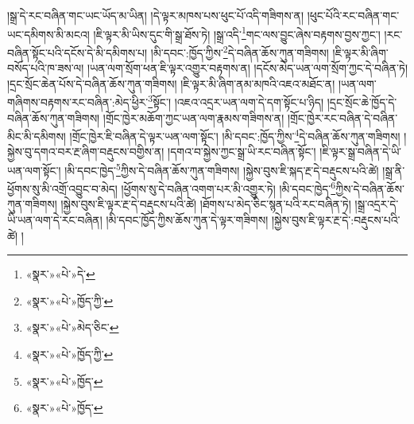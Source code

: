 །སྒྲ་དེ་རང་བཞིན་གང་ཡང་ཡོད་མ་ཡིན། །དེ་ལྟར་མཁས་པས་ཕུང་པོ་འདི་གཟིགས་ན། །ཕུང་པོའི་རང་བཞིན་གང་ཡང་དམིགས་མི་མངའ། །ཇི་ལྟར་མི་ཡིས་དུང་གི་སྒྲ་ཐོས་ཏེ། །སྒྲ་འདི་\footnote{«སྣར་»«པེ་»དེ་}གང་ལས་བྱུང་ཞེས་བརྟགས་བྱས་ཀྱང་། །རང་བཞིན་སྟོང་པའི་དངོས་དེ་མི་དམིགས་པ། །མི་དབང་:ཁྱོད་ཀྱིས་\footnote{«སྣར་»«པེ་»ཁྱོད་ཀྱི་}དེ་བཞིན་ཆོས་ཀུན་གཟིགས། །ཇི་ལྟར་མི་ཞིག་བསོད་པའི་ཁ་ཟས་ལ། །ཡན་ལག་སྲོག་ཕན་ཇི་ལྟར་འགྱུར་བརྟགས་ན། །དངོས་མེད་ཡན་ལག་སྲོག་ཀྱང་དེ་བཞིན་ཏེ། །དྲང་སྲོང་ཆེན་པོས་དེ་བཞིན་ཆོས་ཀུན་གཟིགས། །ཇི་ལྟར་མི་ཞིག་ནམ་མཁའི་འཇའ་མཐོང་ན། །ཡན་ལག་གཞིགས་བརྟགས་རང་བཞིན་:མེད་ཕྱིར་\footnote{«སྣར་»«པེ་»མེད་ཅིང་}སྟོང་། །འཇའ་འདྲར་ཡན་ལག་དེ་དག་སྟོང་པ་ཉིད། །དྲང་སྲོང་ཆེ་ཁྱོད་དེ་བཞིན་ཆོས་ཀུན་གཟིགས། །གྲོང་ཁྱེར་མཆོག་ཀྱང་ཡན་ལག་རྣམས་གཟིགས་ན། །གྲོང་ཁྱེར་རང་བཞིན་དེ་བཞིན་མིང་མི་དམིགས། །གྲོང་ཁྱེར་ཇི་བཞིན་དེ་ལྟར་ཡན་ལག་སྟོང་། །མི་དབང་:ཁྱོད་ཀྱིས་\footnote{«སྣར་»«པེ་»ཁྱོད་ཀྱི་}དེ་བཞིན་ཆོས་ཀུན་གཟིགས། །སྐྱེས་བུ་དགའ་བར་རྔ་ཞིག་བརྡུངས་བགྱིས་ན། །དགའ་བ་སྐྱེས་ཀྱང་སྒྲ་ཡི་རང་བཞིན་སྟོང་། །ཇི་ལྟར་སྒྲ་བཞིན་དེ་ཡི་ཡན་ལག་སྟོང་། །མི་དབང་ཁྱེད་\footnote{«སྣར་»«པེ་»ཁྱོད་}ཀྱིས་དེ་བཞིན་ཆོས་ཀུན་གཟིགས། །སྐྱེས་བུས་ཇི་སྐད་རྔ་དེ་བརྡུངས་པའི་ཚེ། །སྒྲ་ནི་ཕྱོགས་སུ་མི་འགྲོ་འབྱུང་བ་མེད། །ཕྱོགས་སུ་དེ་བཞིན་འགག་པར་མི་འགྱུར་ཏེ། །མི་དབང་ཁྱེད་\footnote{«སྣར་»«པེ་»ཁྱོད་}ཀྱིས་དེ་བཞིན་ཆོས་ཀུན་གཟིགས། །སྐྱེས་བུས་ཇི་ལྟར་རྔ་དེ་བརྡུངས་པའི་ཚེ། །ཐོགས་པ་མེད་ཅིང་སྙན་པའི་རང་བཞིན་ཏེ། །སྒྲ་འདྲར་དེ་ཡི་ཡན་ལག་དེ་རང་བཞིན། །མི་དབང་ཁྱོད་ཀྱིས་ཆོས་ཀུན་དེ་ལྟར་གཟིགས། །སྐྱེས་བུས་ཇི་ལྟར་རྔ་དེ་:བརྡུངས་པའི་ཚེ། །
